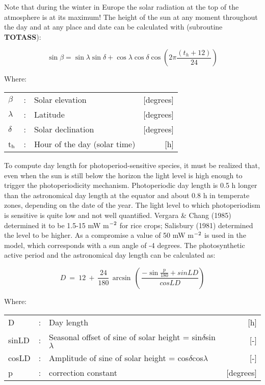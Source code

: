 Note that during the winter in Europe the solar radiation at the top of the atmo\-sphere is at its maximum! The height of the sun at any moment throughout the day and at any place and date can be
calculated with (subroutine {\bf TOTASS}):

\begin{equation}
\sin \beta = \sin \lambda \sin \delta + \cos \lambda \cos \delta \cos (2 \pi {\frac{(t _{h} +12)}{24}} )
\end{equation}

Where:\\[5pt]
\begin{tabularx}{\textwidth}{llXr}
$\beta$ &:& Solar elevation  & [degrees]\\
$\lambda$ &:& Latitude  & [degrees]\\
$\delta$ &:& Solar declination  & [degrees]\\
t$_{{\rm h}}$ &:& Hour of the day (solar time)  & [h]\\
\end{tabularx}

To compute day length for photoperiod-sensitive species, it must be realized that, even
when the sun is still below the horizon the light level is high enough to trigger the
photoperiodicity mechan\-ism. Photoperiodic day length is 0.5 h longer than the astronomi\-cal day length at the equator and about 0.8 h in temperate zones, depend\-ing on the date of the year. The light level to which photoperiodism is sensitive is quite low and not well
quantified. Vergara \& Chang (1985) determined it to be 1.5-15 mW m$^{{\rm -2}}$ for rice crops; Salisbury (1981) determined the level to be higher. As a compromise a value of 50 mW
m$^{{\rm -2}}$ is used in the model, which corresponds with a sun angle of -4 degrees. The
photosynthetic active period and the astro\-nomical day length can be calculated as:

\begin{equation}
D ~=~ 12~+~{\frac{24}{180}} \, \arcsin \, (\,{\frac{-\sin {\frac{p}{180}} + sinLD}{cosLD}} )
\end{equation}

Where:\\[5pt]
\begin{tabularx}{\textwidth}{llXr}
D &:& Day length  & [h]\\
sinLD &:& Seasonal offset of sine of solar height = sin$\delta$sin$\lambda$  & [-]\\
cosLD &:& Amplitude of sine of solar height = cos$\delta$cos$\lambda$  & [-]\\
p &:& correction constant  & [degrees]\\
\end{tabularx}


